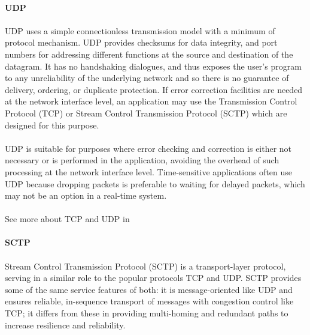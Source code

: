 \paragraph{} \textbf{UDP}
\paragraph{}
UDP uses a simple connectionless transmission model with a minimum of protocol mechanism. UDP provides checksums for data integrity, and port numbers for addressing different functions at the source and destination of the datagram. It has no handshaking dialogues, and thus exposes the user's program to any unreliability of the underlying network and so there is no guarantee of delivery, ordering, or duplicate protection. If error correction facilities are needed at the network interface level, an application may use the Transmission Control Protocol (TCP) or Stream Control Transmission Protocol (SCTP) which are designed for this purpose.
\paragraph{}
UDP is suitable for purposes where error checking and correction is either not necessary or is performed in the application, avoiding the overhead of such processing at the network interface level. Time-sensitive applications often use UDP because dropping packets is preferable to waiting for delayed packets, which may not be an option in a real-time system.
\paragraph{}
See more about TCP and UDP in \cite{IP_TCP_UDP}

\paragraph{} \textbf{SCTP}
\paragraph{}
Stream Control Transmission Protocol (SCTP) is a transport-layer protocol, serving in a similar role to the popular protocols TCP and UDP. SCTP provides some of the same service features of both: it is message-oriented like UDP and ensures reliable, in-sequence transport of messages with congestion control like TCP; it differs from these in providing multi-homing and redundant paths to increase resilience and reliability.
